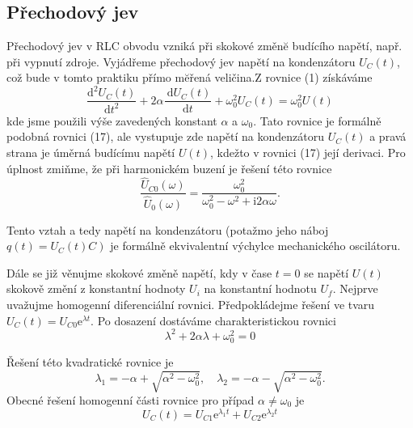 \documentclass[czech,11pt,a4paper]{article}
\begin{document}
\begin{multicols}{2}
		\section{Přechodový jev}
		Přechodový jev v RLC obvodu vzniká při skokové změnĕ budícího napětí, např. při vypnutí zdroje. Vyjádřeme přechodový jev napětí na kondenzátoru $U_{C}(t)$, což bude v tomto praktiku přímo mĕřená veličina.Z rovnice (1) získáváme
		\begin{equation}
			\frac{\mathrm{d}^{2} U_{C}(t)}{\mathrm{d} t^{2}}+2 \alpha \frac{\mathrm{~d} U_{C}(t)}{\mathrm{d} t}+\omega_{0}^{2} U_{C}(t)=\omega_{0}^{2} U(t)		
		\end{equation}
		kde jsme použili výše zavedených konstant $\alpha $ a $\omega_{0}$. Tato rovnice je formálně podobná rovnici (17), ale vystupuje zde napětí na kondenzátoru $U_{C}(t)$ a pravá strana je úměrná budícímu napětí $U(t)$, kdežto v rovnici (17) její derivaci. Pro úplnost zmiňme, že při harmonickém buzení je řešení této rovnice
		\begin{equation}
			\frac{\hat{U}_{C 0}(\omega)}{\hat{U}_{0}(\omega)}=\frac{\omega_{0}^{2}}{\omega_{0}^{2}-\omega^{2}+\mathrm{i} 2 \alpha \omega} .
		\end{equation}
		
		
		Tento vztah a tedy napětí na kondenzátoru (potažmo jeho náboj $\left.q(t)=U_{C}(t) C\right)$ je formálně ekvivalentní výchylce mechanického oscilátoru.
		
		Dále se již věnujme skokové změně napětí, kdy v čase $t=0$ se napětí $U(t)$ skokově změní z konstantní hodnoty $U_{i}$ na konstantní hodnotu $U_{f}$. Nejprve uvažujme homogenní diferenciální rovnici. Předpokládejme řešení ve tvaru $U_{C}(t)=U_{C 0} \mathrm{e}^{\lambda t}$. Po dosazení dostáváme charakteristickou rovnici
		\begin{equation}
			\lambda^{2}+2 \alpha \lambda+\omega_{0}^{2}=0
		\end{equation}
		
		
		Řešení této kvadratické rovnice je
		\begin{equation}
			\lambda_{1}=-\alpha+\sqrt{\alpha^{2}-\omega_{0}^{2}}, \quad \lambda_{2}=-\alpha-\sqrt{\alpha^{2}-\omega_{0}^{2}} .
		\end{equation}
		Obecné řešení homogenní části rovnice pro případ $\alpha \neq \omega_{0}$ je
		\begin{equation}
			U_{C}(t)=U_{C 1} \mathrm{e}^{\lambda_{1} t}+U_{C 2} \mathrm{e}^{\lambda_{2} t}
		\end{equation}
		

\end{multicols}
\end{document}
